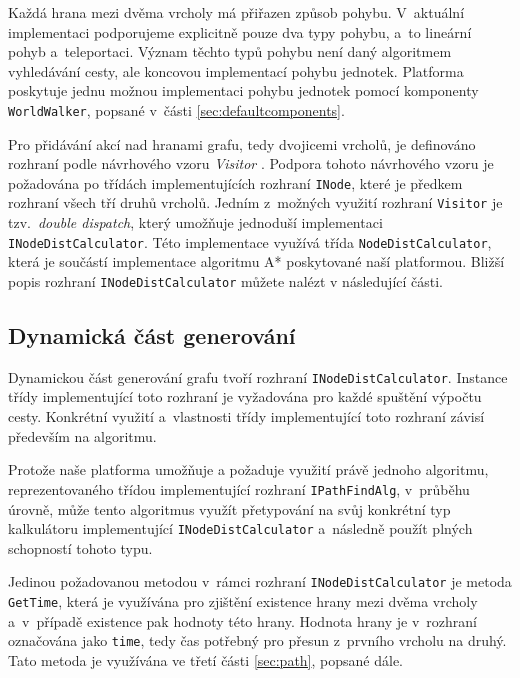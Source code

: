 Každá hrana mezi dvěma vrcholy má přiřazen způsob pohybu. V~aktuální implementaci podporujeme explicitně pouze dva typy pohybu, a~to lineární pohyb a~teleportaci. Význam těchto typů pohybu není daný algoritmem vyhledávání cesty, ale koncovou implementací pohybu jednotek. Platforma poskytuje jednu možnou implementaci pohybu jednotek pomocí komponenty \texttt{WorldWalker}, popsané v~části \ref{sec:defaultcomponents}.

Pro přidávání akcí nad hranami grafu, tedy dvojicemi vrcholů, je definováno rozhraní podle návrhového vzoru \textit{Visitor} \citep[str.~331]{book:gangoffour}. Podpora tohoto návrhového vzoru je požadována po třídách implementujících rozhraní \texttt{INode}, které je předkem rozhraní všech tří druhů vrcholů. Jedním z~možných využití rozhraní \texttt{Visitor} je tzv.~\textit{double dispatch}, který umožňuje jednoduší implementaci \texttt{INodeDistCalculator}. Této implementace využívá třída \texttt{NodeDistCalculator}, která je součástí implementace algoritmu A* poskytované naší platformou. Bližší popis rozhraní \texttt{INodeDistCalculator} můžete nalézt v následující části.

\subsection{Dynamická část generování}
Dynamickou část generování grafu tvoří rozhraní \texttt{INodeDistCalculator}. Instance třídy implementující toto rozhraní je vyžadována pro každé spuštění výpočtu cesty. Konkrétní využití a~vlastnosti třídy implementující toto rozhraní závisí především na algoritmu. 

Protože naše platforma umožňuje a požaduje využití právě jednoho algoritmu, reprezentovaného třídou implementující rozhraní 
\texttt{IPathFindAlg}, v~průběhu úrovně, může tento algoritmus využít přetypování na svůj konkrétní typ kalkulátoru implementující \texttt{INodeDistCalculator} a~následně použít plných schopností tohoto typu. 


Jedinou požadovanou metodou v~rámci rozhraní \texttt{INodeDistCalculator} je metoda \texttt{GetTime}, která je využívána pro zjištění existence hrany mezi dvěma vrcholy a~v~případě existence pak hodnoty této hrany. Hodnota hrany je v~rozhraní označována jako \texttt{time}, tedy čas potřebný pro přesun z~prvního vrcholu na druhý. Tato metoda je využívána ve třetí části \ref{sec:path}, popsané dále.

